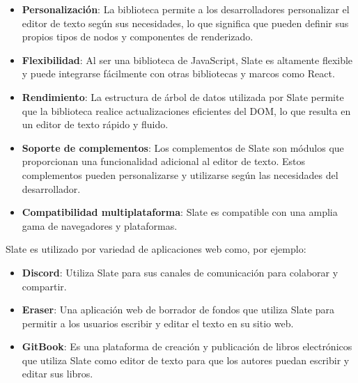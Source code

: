 \begin{itemize}
  \item \textbf{Personalización}: La biblioteca permite a los desarrolladores personalizar el editor de texto según sus necesidades, lo que significa que pueden definir sus propios tipos de nodos y componentes de renderizado.
  \item \textbf{Flexibilidad}: Al ser una biblioteca de JavaScript, Slate es altamente flexible y puede integrarse fácilmente con otras bibliotecas y marcos como React.
  \item \textbf{Rendimiento}: La estructura de árbol de datos utilizada por Slate permite que la biblioteca realice actualizaciones eficientes del DOM, lo que resulta en un editor de texto rápido y fluido.
  \item \textbf{Soporte de complementos}: Los complementos de Slate son módulos que proporcionan una funcionalidad adicional al editor de texto. Estos complementos pueden personalizarse y utilizarse según las necesidades del desarrollador.
  \item \textbf{Compatibilidad multiplataforma}: Slate es compatible con una amplia gama de navegadores y plataformas.
\end{itemize}

Slate es utilizado por variedad de aplicaciones web como, por ejemplo:
\begin{itemize}
  \item \textbf{Discord}: Utiliza Slate para sus canales de comunicación para colaborar y compartir.
  \item \textbf{Eraser}: Una aplicación web de borrador de fondos que utiliza Slate para permitir a los usuarios escribir y editar el texto en su sitio web.
  \item \textbf{GitBook}: Es una plataforma de creación y publicación de libros electrónicos que utiliza Slate como editor de texto para que los autores puedan escribir y editar sus libros.
\end{itemize}